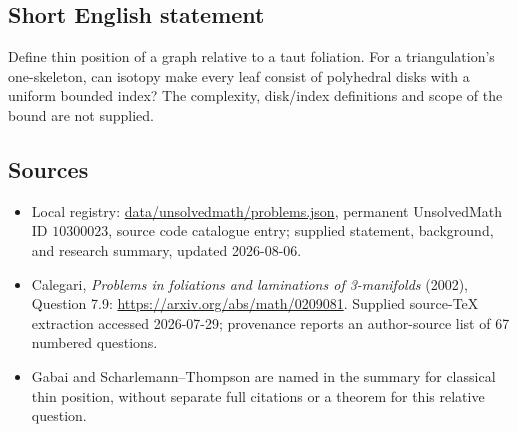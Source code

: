 \documentclass[11pt]{article}
\begin{document}
\subsection{Short English statement}
Define thin position of a graph relative to a taut foliation. For a triangulation's one-skeleton, can isotopy make every leaf consist of polyhedral disks with a uniform bounded index? The complexity, disk/index definitions and scope of the bound are not supplied.
\subsection{Sources}
\begin{itemize}
\item Local registry: \url{data/unsolvedmath/problems.json}, permanent UnsolvedMath ID \(10300023\), source code catalogue entry; supplied statement, background, and research summary, updated 2026-08-06.
\item Calegari, \emph{Problems in foliations and laminations of 3-manifolds} (2002), Question 7.9: \url{https://arxiv.org/abs/math/0209081}. Supplied source-TeX extraction accessed 2026-07-29; provenance reports an author-source list of 67 numbered questions.
\item Gabai and Scharlemann--Thompson are named in the summary for classical thin position, without separate full citations or a theorem for this relative question.
\end{itemize}
\end{document}
